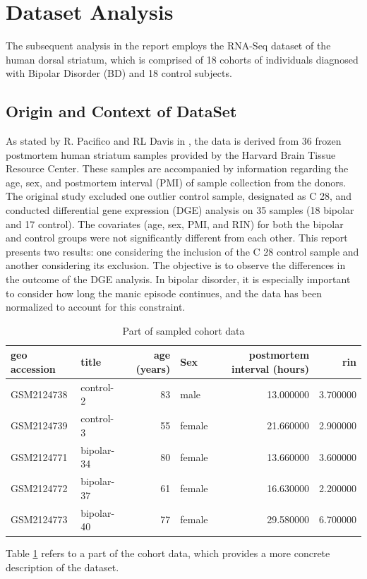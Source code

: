 \section{Dataset Analysis}
The subsequent analysis in the report employs the RNA-Seq dataset of the human dorsal striatum, which is comprised of 18 cohorts of individuals diagnosed with Bipolar Disorder (BD) and 18 control subjects.
\subsection{Origin and Context of DataSet}
As stated by R. Pacifico and RL Davis in \cite{pacifico2017transcriptome}, the data is derived from 36 frozen postmortem human striatum samples provided by the Harvard Brain Tissue Resource Center. These samples are accompanied by information regarding the age, sex, and postmortem interval (PMI) of sample collection from the donors. The original study excluded one outlier control sample, designated as C 28, and conducted differential gene expression (DGE) analysis on 35 samples (18 bipolar and 17 control). The covariates (age, sex, PMI, and RIN) for both the bipolar and control groups were not significantly different from each other. This report presents two results: one considering the inclusion of the C 28 control sample and another considering its exclusion. The objective is to observe the differences in the outcome of the DGE analysis. In bipolar disorder, it is especially important to consider how long the manic episode continues, and the data has been normalized to account for this constraint.
\begin{table}[H]
\centering
\begin{tabular}{llrlrr}
\toprule
geo accession & title & age (years) & Sex & postmortem interval (hours) & rin \\
\midrule
GSM2124738 & control-2 & 83 & male & 13.000000 & 3.700000 \\
GSM2124739 & control-3 & 55 & female & 21.660000 & 2.900000 \\
GSM2124771 & bipolar-34 & 80 & female & 13.660000 & 3.600000 \\
GSM2124772 & bipolar-37 & 61 & female & 16.630000 & 2.200000 \\
GSM2124773 & bipolar-40 & 77 & female & 29.580000 & 6.700000 \\
\bottomrule
\end{tabular}
\caption{Part of sampled cohort data}
\label{tab:metadata_entr}
\end{table}
Table \ref{tab:metadata_entr} refers to a part of the cohort data, which provides a more concrete description of the dataset.
